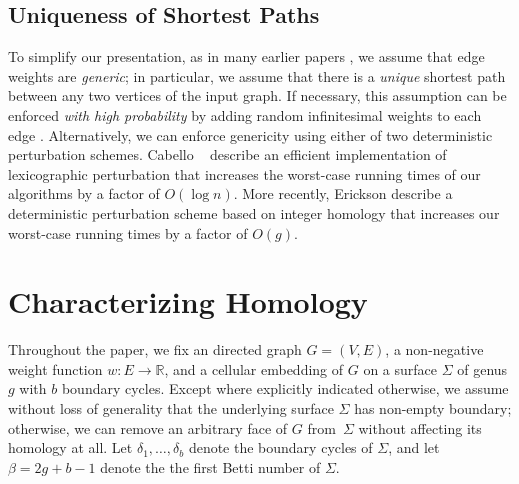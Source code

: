 \documentclass[11pt,twoside]{article}
\def\Real{\mathbb{R}}
\begin{document}


\subsection{Uniqueness of Shortest Paths}
\label{SS:unique}

To simplify our presentation, as in many earlier papers \cite{cce-msspe-13, benw-amcnt-16, mnnw-mdpgo-18, bsw-msopg-15, e-pspmf-10, eh-ocsd-04}, we assume that edge weights are \emph{generic}; in particular, we assume that there is a \emph{unique} shortest path between any two vertices of the input graph.  If necessary, this assumption can be enforced \emph{with high probability} by adding random infinitesimal weights to each edge \cite{mvv-memi-87}.  Alternatively, we can enforce genericity using either of two deterministic perturbation schemes.  Cabello \etal~\cite{cce-msspe-13} describe an efficient implementation of lexicographic perturbation \cite{c-odlp-52,dow-gsmml-55,hm-apmcb-94} that increases the worst-case running times of our algorithms by a factor of $O(\log n)$.  More recently, Erickson \etal \cite{efl-hmcpf-18} describe a deterministic perturbation scheme based on integer homology that increases our worst-case running times by a factor of $O(g)$.

\section{Characterizing Homology}
\label{S:tree-cotree}


Throughout the paper, we fix an  directed graph $G=(V,E)$, a non-negative weight function $w\colon E\to \Real$, and a cellular embedding of $G$ on a surface $\Sigma$ of genus $g$ with $b$ boundary cycles.
Except where explicitly indicated otherwise, we assume without loss of generality  that the underlying surface $\Sigma$ has non-empty boundary; otherwise, we can remove an arbitrary face of $G$ from~$\Sigma$ without affecting its homology at all.  Let $\delta_1, \dots, \delta_b$ denote the boundary cycles of $\Sigma$, and let $\beta = 2g+b-1$ denote the the first Betti number of $\Sigma$.
\end{document}
